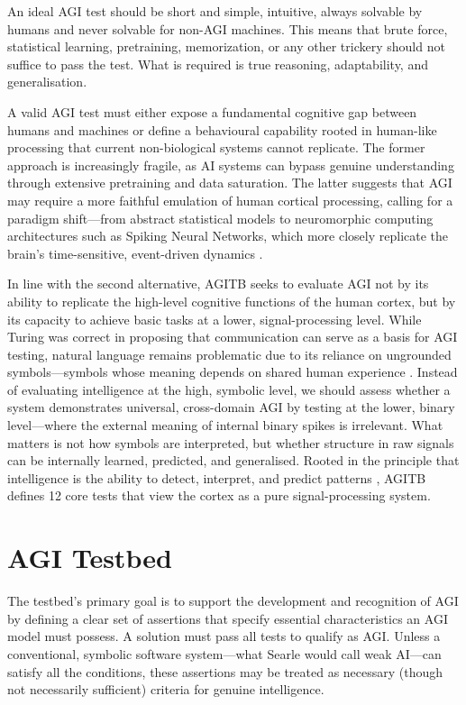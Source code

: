 \documentclass{article}
\begin{document}
An ideal AGI test should be short and simple, intuitive, always solvable by humans and never solvable for non-AGI machines. This means that brute force, statistical learning, pretraining, memorization, or any other trickery should not suffice to pass the test. What is required is true reasoning, adaptability, and generalisation.

A valid AGI test must either expose a fundamental cognitive gap between humans and machines or define a behavioural capability rooted in human-like processing that current non-biological systems cannot replicate. The former approach is increasingly fragile, as AI systems can bypass genuine understanding through extensive pretraining and data saturation. The latter suggests that AGI may require a more faithful emulation of human cortical processing, calling for a paradigm shift—from abstract statistical models to neuromorphic computing architectures such as Spiking Neural Networks, which more closely replicate the brain's time-sensitive, event-driven dynamics \cite{Maass1997}.

In line with the second alternative, AGITB seeks to evaluate AGI not by its ability to replicate the high-level cognitive functions of the human cortex, but by its capacity to achieve basic tasks at a lower, signal-processing level. While Turing was correct in proposing that communication can serve as a basis for AGI testing, natural language remains problematic due to its reliance on ungrounded symbols—symbols whose meaning depends on shared human experience \cite{Harnad1990}. Instead of evaluating intelligence at the high, symbolic level, we should assess whether a system demonstrates universal, cross-domain AGI by testing at the lower, binary level—where the external meaning of internal binary spikes is irrelevant. What matters is not how symbols are interpreted, but whether structure in raw signals can be internally learned, predicted, and generalised. Rooted in the principle that intelligence is the ability to detect, interpret, and predict patterns \cite{Hawkins2004}, AGITB defines 12 core tests that view the cortex as a pure signal-processing system.



\section{AGI Testbed}

The testbed's primary goal is to support the development and recognition of AGI by defining a clear set of assertions that specify essential characteristics an AGI model must possess. A solution must pass all tests to qualify as AGI. Unless a conventional, symbolic software system—what Searle \cite{Searle1980} would call weak AI—can satisfy all the conditions, these assertions may be treated as necessary (though not necessarily sufficient) criteria for genuine intelligence.
\end{document}
